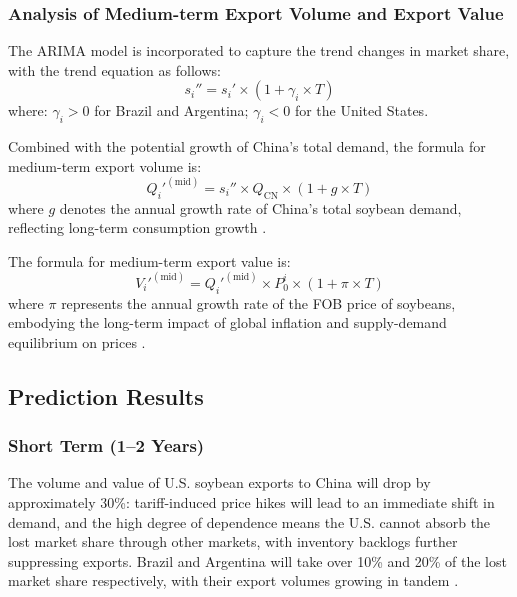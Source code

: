 \documentclass{apmcmthesis}
\begin{document}
\subsubsection{Analysis of Medium-term Export Volume and Export Value}
The ARIMA model is incorporated to capture the trend changes in market share, with the trend equation as follows:
\begin{equation}
s_{i}'' = s_{i}' \times \left(1 + \gamma_{i} \times T\right)
\end{equation}
where:
$\gamma_{i} > 0$ for Brazil and Argentina;
$\gamma_{i} < 0$ for the United States.

Combined with the potential growth of China's total demand, the formula for medium-term export volume is:
\begin{equation}
Q_{i}'^{(\text{mid})} = s_{i}'' \times Q_{\text{CN}} \times (1 + g \times T)
\end{equation}
where $g$ denotes the annual growth rate of China's total soybean demand, reflecting long-term consumption growth \cite{fao2025stat}.

The formula for medium-term export value is:
\begin{equation}
V_{i}'^{(\text{mid})} = Q_{i}'^{(\text{mid})} \times P_{0}^{i} \times (1 + \pi \times T)
\end{equation}
where $\pi$ represents the annual growth rate of the FOB price of soybeans, embodying the long-term impact of global inflation and supply-demand equilibrium on prices \cite{worldbank2025prospects}.



\subsection{Prediction Results}
\subsubsection{Short Term (1–2 Years)}
The volume and value of U.S. soybean exports to China will drop by approximately 30\%: tariff-induced price hikes will lead to an immediate shift in demand, and the high degree of dependence means the U.S. cannot absorb the lost market share through other markets, with inventory backlogs further suppressing exports. Brazil and Argentina will take over 10\% and 20\% of the lost market share respectively, with their export volumes growing in tandem \cite{usda2025oilseeds}.
\end{document}
